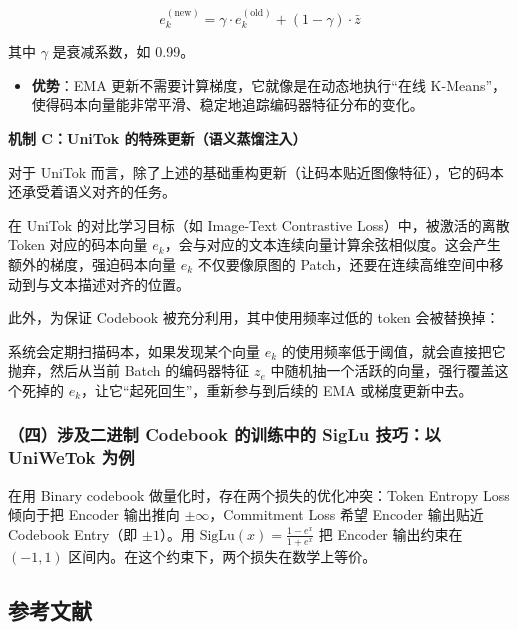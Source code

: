 \[
e_k^{(\mathrm{new})}
=\gamma\cdot e_k^{(\mathrm{old})}+(1-\gamma)\cdot\bar z
\]

其中 \(\gamma\) 是衰减系数，如 0.99。

\begin{itemize}
\tightlist
\item
  \textbf{优势}：EMA 更新不需要计算梯度，它就像是在动态地执行``在线 K-Means''，使得码本向量能非常平滑、稳定地追踪编码器特征分布的变化。
\end{itemize}

\textbf{机制 C：UniTok 的特殊更新（语义蒸馏注入）}

对于 UniTok 而言，除了上述的基础重构更新（让码本贴近图像特征），它的码本还承受着语义对齐的任务。

在 UniTok 的对比学习目标（如 Image-Text Contrastive Loss）中，被激活的离散 Token 对应的码本向量 \(e_k\)，会与对应的文本连续向量计算余弦相似度。这会产生额外的梯度，强迫码本向量 \(e_k\) 不仅要像原图的 Patch，还要在连续高维空间中移动到与文本描述对齐的位置。

此外，为保证 Codebook 被充分利用，其中使用频率过低的 token 会被替换掉：

系统会定期扫描码本，如果发现某个向量 \(e_k\) 的使用频率低于阈值，就会直接把它抛弃，然后从当前 Batch 的编码器特征 \(z_e\) 中随机抽一个活跃的向量，强行覆盖这个死掉的 \(e_k\)，让它``起死回生''，重新参与到后续的 EMA 或梯度更新中去。

\hypertarget{ux56dbux6d89ux53caux4e8cux8fdbux5236-codebook-ux7684ux8badux7ec3ux4e2dux7684-siglu-ux6280ux5de7ux4ee5-uniwetok-ux4e3aux4f8b}{%
\subsubsection{（四）涉及二进制 Codebook 的训练中的 SigLu 技巧：以 UniWeTok 为例}\label{ux56dbux6d89ux53caux4e8cux8fdbux5236-codebook-ux7684ux8badux7ec3ux4e2dux7684-siglu-ux6280ux5de7ux4ee5-uniwetok-ux4e3aux4f8b}}

在用 Binary codebook 做量化时，存在两个损失的优化冲突：Token Entropy Loss 倾向于把 Encoder 输出推向 \(\pm\infty\)，Commitment Loss 希望 Encoder 输出贴近 Codebook Entry（即 \(\pm1\)）。用 \(\mathrm{SigLu}(x)=\frac{1-e^x}{1+e^x}\) 把 Encoder 输出约束在 \((-1,1)\) 区间内。在这个约束下，两个损失在数学上等价。

\hypertarget{ux53c2ux8003ux6587ux732e-196}{%
\subsection{参考文献}\label{ux53c2ux8003ux6587ux732e-196}}

